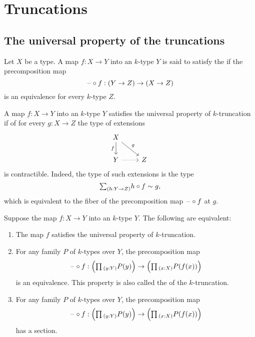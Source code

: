 \section{Truncations}

\subsection{The universal property of the truncations}

\begin{defn}\label{defn:is_truncation}
Let $X$ be a type. A map $f:X\to Y$ into an $k$-type $Y$ is said to satisfy the  if the precomposition map
\begin{equation*}
\mathord{\hspace{1pt}\text{--}\hspace{1pt}}\circ f: (Y\to Z)\to (X\to Z)
\end{equation*}
is an equivalence for every $k$-type $Z$.
\end{defn}

\begin{rmk}
A map $f:X\to Y$ into an $k$-type $Y$ satisfies the universal property of $k$-truncation if of for every $g:X\to Z$ the type of extensions
\begin{equation*}
\begin{tikzcd}
X \arrow[dr,"g"] \arrow[d,swap,"f"] \\
Y \arrow[r,densely dotted] & Z
\end{tikzcd}
\end{equation*}
is contractible. Indeed, the type of such extensions is the type
\begin{equation*}
\sm{h:Y\to Z} h\circ f\htpy g,
\end{equation*}
which is equivalent to the fiber of the precomposition map $\mathord{\hspace{1pt}\text{--}\hspace{1pt}}\circ f$ at $g$. 
\end{rmk}

\begin{thm}\label{thm:trunc_dup}
  Suppose the map $f:X\to Y$ into an $k$-type $Y$. The following are equivalent:
  \begin{enumerate}
  \item The map $f$ satisfies the universal property of $k$-truncation.
  \item For any family $P$ of $k$-types over $Y$, the precomposition map
    \begin{equation*}
      \blank\circ f : \Big(\prd{y:Y}P(y)\Big)\to \Big(\prd{x:X}P(f(x))\Big)
    \end{equation*}
    is an equivalence. This property is also called the  of the $k$-truncation.
  \item For any family $P$ of $k$-types over $Y$, the precomposition map
    \begin{equation*}
      \blank\circ f : \Big(\prd{y:Y}P(y)\Big)\to\Big(\prd{x:X}P(f(x))\Big)
    \end{equation*}
    has a section.
  \end{enumerate}
\end{thm}


